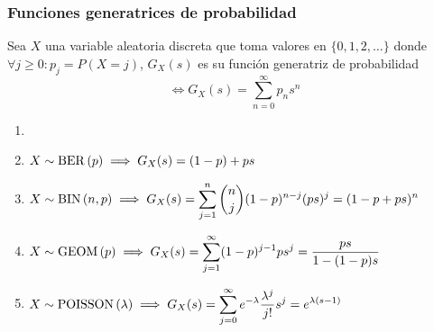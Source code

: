 \subsubsection{Funciones generatrices de probabilidad}
\begin{defn}
	Sea $X$ una variable aleatoria discreta que toma valores en $\{0, 1, 2, \dots\}$ donde $\forall j \geq 0 : p_j=P(X=j)$, $G_X(s)$ es su función generatriz de probabilidad
	\[\iff G_X(s)=\sum_{n=0}^\infty p_ns^n\]
\end{defn}
\begin{ejem}
	\begin{enumerate}
		\item[]
		\item $\displaystyle X \sim \operatorname{BER}\left(p\right) \implies G_X(s)=(1-p)+ps$
		\item $\displaystyle X \sim \operatorname{BIN}\left(n, p\right) \implies G_X(s)= \sum_{j=1}^{n} \binom{n}{j} (1-p)^{n-j}(ps)^j = (1-p+ps)^n$
		\item $\displaystyle X \sim \operatorname{GEOM}\left(p\right) \implies G_X(s)=\sum_{j=1}^\infty (1-p)^{j-1}ps^j = \frac{ps}{1-(1-p)s}$
		\item $\displaystyle X \sim \operatorname{POISSON}\left(\lambda\right) \implies G_X(s)=\sum_{j=0}^\infty e^{-\lambda}\frac{\lambda^j}{j!}s^j = e^{\lambda(s-1)}$
	\end{enumerate}
\end{ejem}

